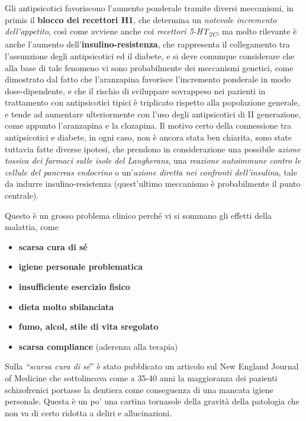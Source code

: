 Gli antipsicotici favoriscono l'aumento ponderale tramite diversi
meccanismi, in primis il \textbf{blocco dei recettori H1}, che determina
un \emph{notevole incremento dell'appetito}, così come avviene anche coi
\emph{recettori 5-HT\textsubscript{2C}}, ma molto rilevante è anche
l'aumento dell'\textbf{insulino-resistenza}, che rappresenta il
collegamento tra l'assunzione degli antipsicotici ed il diabete, e si
deve comunque considerare che alla base di tale fenomeno vi sono
probabilmente dei meccanismi genetici, come dimostrato dal fatto che
l'aranzapina favorisce l'incremento ponderale in modo dose-dipendente, e
che il rischio di sviluppare sovrappeso nei pazienti in trattamento con
antipsicotici tipici è triplicato rispetto alla popolazione generale, e
tende ad aumentare ulteriormente con l'uso degli antipsicotici di II
generazione, come appunto l'aranzapina e la clozapina. Il motivo certo
della connessione tra antipsicotici e diabete, in ogni caso, non è
ancora stata ben chiarita, sono state tuttavia fatte diverse ipotesi,
che prendono in considerazione una possibile \emph{azione tossica dei
farmaci sulle isole del Langherans}, una \emph{reazione autoimmune
contro le cellule del pancreas endocrino} o un'\emph{azione diretta nei
confronti dell'insulina}, tale da indurre insulino-resistenza
(quest'ultimo meccanismo è probabilmente il punto centrale).

Questo è un grosso problema clinico perché vi si sommano gli effetti
della malattia, come

\begin{itemize}
\item
  \textbf{scarsa cura di sé}
\item
  \textbf{igiene personale problematica}
\item
  \textbf{insufficiente esercizio fisico }
\item
  \textbf{dieta molto sbilanciata}
\item
  \textbf{fumo, alcol, stile di vita sregolato }
\item
  \textbf{scarsa compliance} (aderenza alla terapia)
\end{itemize}

Sulla \emph{``scarsa cura di sé}'' è stato pubblicato un articolo sul
New England Journal of Medicine che sottolineava come a 35-40 anni la
maggioranza dei pazienti schizofrenici portasse la dentiera come
conseguenza di una mancata igiene personale. Questa è un po' una cartina
tornasole della gravità della patologia che non va di certo ridotta a
deliri e allucinazioni.

